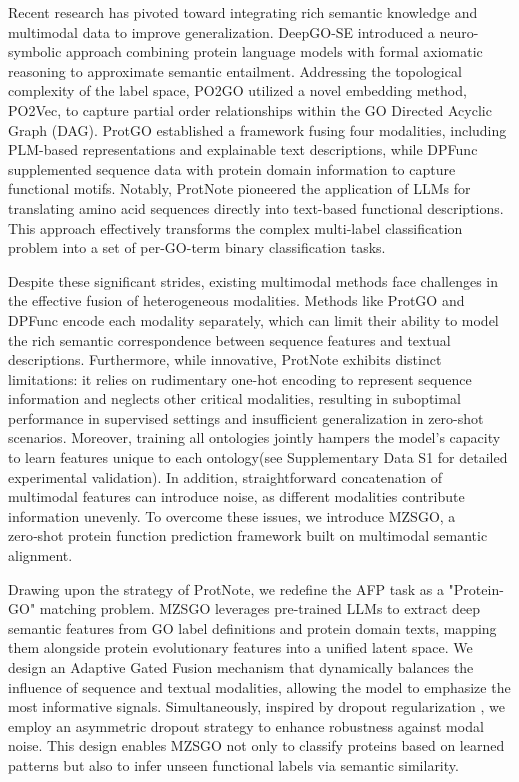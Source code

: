 \documentclass[unnumsec,webpdf,contemporary,large]{oup-authoring-template}%
\theoremstyle{thmstyleone}%
\theoremstyle{thmstyletwo}%
\theoremstyle{thmstylethree}%
\begin{document}
Recent research has pivoted toward integrating rich semantic knowledge and multimodal data to improve generalization. DeepGO-SE\citep{kulmanov2024protein} introduced a neuro-symbolic approach combining protein language models with formal axiomatic reasoning to approximate semantic entailment. Addressing the topological complexity of the label space, PO2GO\citep{li2024partial} utilized a novel embedding method, PO2Vec, to capture partial order relationships within the GO Directed Acyclic Graph (DAG)\citep{goeman2008multiple}. ProtGO\citep{wang2025protgo} established a framework fusing four modalities, including PLM-based representations and explainable text descriptions, while DPFunc\citep{wang2025dpfunc} supplemented sequence data with protein domain information to capture functional motifs. Notably, ProtNote\citep{char2025protnote} pioneered the application of LLMs for translating amino acid sequences directly into text-based functional descriptions. This approach effectively transforms the complex multi-label classification problem into a set of per-GO-term binary classification tasks.

Despite these significant strides, existing multimodal methods face challenges in the effective fusion of heterogeneous modalities. Methods like ProtGO and DPFunc encode each modality separately, which can limit their ability to model the rich semantic correspondence between sequence features and textual descriptions. Furthermore, while innovative, ProtNote exhibits distinct limitations: it relies on rudimentary one-hot encoding to represent sequence information and neglects other critical modalities, resulting in suboptimal performance in supervised settings and insufficient generalization in zero-shot scenarios. Moreover, training all ontologies jointly hampers the model’s capacity to learn features unique to each ontology(see Supplementary Data S1 for detailed experimental validation). In addition, straightforward concatenation of multimodal features can introduce noise, as different modalities contribute information unevenly. To overcome these issues, we introduce MZSGO, a zero‑shot protein function prediction framework built on multimodal semantic alignment.

Drawing upon the strategy of ProtNote, we redefine the AFP task as a "Protein-GO" matching problem. MZSGO leverages pre-trained LLMs to extract deep semantic features from GO label definitions and protein domain texts, mapping them alongside protein evolutionary features into a unified latent space. We design an Adaptive Gated Fusion mechanism that dynamically balances the influence of sequence and textual modalities, allowing the model to emphasize the most informative signals. Simultaneously, inspired by dropout regularization \citep{srivastava2014dropout}, we employ an asymmetric dropout strategy to enhance robustness against modal noise. This design enables MZSGO not only to classify proteins based on learned patterns but also to infer unseen functional labels via semantic similarity.
\end{document}
